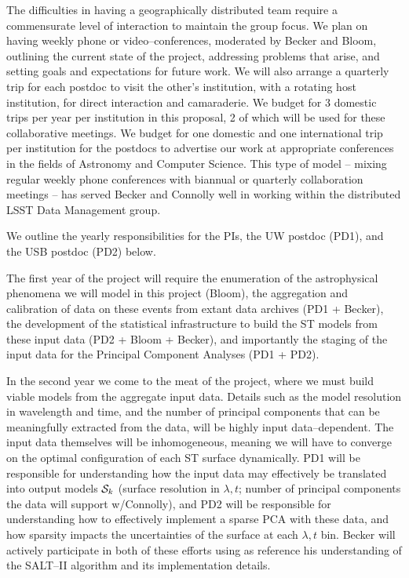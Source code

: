 The difficulties in having a geographically distributed team require a
commensurate level of interaction to maintain the group focus.  We plan on
having weekly phone or video--conferences, moderated by Becker and Bloom,
outlining the current state of the project, addressing problems that arise, and
setting goals and expectations for future work.  We will also arrange a
quarterly trip for each postdoc to visit the other's institution, with a
rotating host institution, for direct interaction and camaraderie. We budget for
3 domestic trips per year per institution in this proposal, 2 of which will be
used for these collaborative meetings.  We budget for one domestic and one
international trip per institution for the postdocs to advertise our work at
appropriate conferences in the fields of Astronomy and Computer Science. This
type of model -- mixing regular weekly phone conferences with biannual or
quarterly collaboration meetings -- has served Becker and Connolly well in
working within the distributed LSST Data Management group.

We outline the yearly responsibilities for the PIs, the UW postdoc (PD1), and
the USB postdoc (PD2) below.

 \smallskip

The first year of the project will require the enumeration of the astrophysical
phenomena we will model in this project (Bloom), the aggregation and calibration
of data on these events from extant data archives (PD1 + Becker), the
development of the statistical infrastructure to build the ST models from these
input data (PD2 + Bloom + Becker), and importantly the staging of the input data
for the Principal Component Analyses (PD1 + PD2).

 \smallskip

In the second year we come to the meat of the project, where we must build
viable models from the aggregate input data.  Details such as the model
resolution in wavelength and time, and the number of principal components that
can be meaningfully extracted from the data, will be highly input
data--dependent.  The input data themselves will be inhomogeneous, meaning we
will have to converge on the optimal configuration of each ST surface
dynamically. PD1 will be responsible for understanding how the input data may
effectively be translated into output models ${\cal S}_k$ (surface resolution in
$\lambda, t$; number of principal components the data will support w/Connolly),
and PD2 will be responsible for understanding how to effectively implement a
sparse PCA with these data, and how sparsity impacts the uncertainties of the
surface at each $\lambda, t$ bin. Becker will actively participate in both of
these efforts using as reference his understanding of the SALT--II algorithm and
its implementation details.


